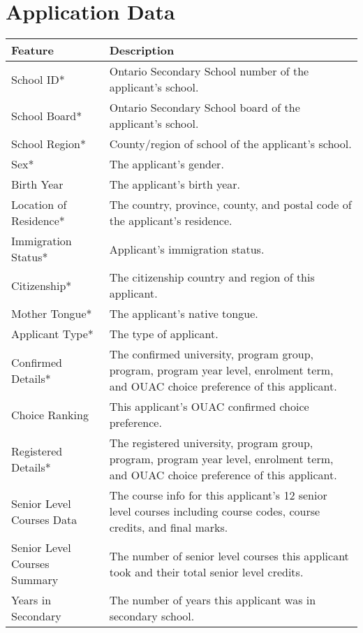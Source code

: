 \documentclass[titlepage]{article}
\begin{document}
\section{Application Data}
\label{app:applicationData}
\vspace*{\fill}
\begin{table}[!hb]
\begin{center}
\begin{tabular}{| C{4cm} | C{10cm} |}\hline
	\textbf{Feature}				&\textbf{Description}\\\hline
	School ID*						&Ontario Secondary School number of the applicant's school.\\\hline
	School Board*					&Ontario Secondary School board of the applicant's school.\\\hline
	School Region*					&County/region of school of the applicant's school.\\\hline
	Sex*							&The applicant's gender.\\\hline
	Birth Year						&The applicant's birth year.\\\hline
	Location of Residence*			&The country, province, county, and postal code of the applicant's residence.\\\hline
	Immigration Status*				&Applicant's immigration status.\\\hline
	Citizenship*					&The citizenship country and region of this applicant.\\\hline
	Mother Tongue*					&The applicant's native tongue.\\\hline
	Applicant Type*					&The type of applicant.\\\hline
	Confirmed Details*				&The confirmed university, program group, program, program year level, enrolment term, and OUAC choice preference of this applicant.\\\hline
	Choice Ranking					&This applicant's OUAC confirmed choice preference.\\\hline
	Registered Details*				&The registered university, program group, program, program year level, enrolment term, and OUAC choice preference of this applicant.\\\hline
	Senior Level Courses Data		&The course info for this applicant's 12 senior level courses including course codes, course credits, and final marks.\\\hline
	Senior Level Courses Summary	&The number of senior level courses this applicant took and their total senior level credits.\\\hline
	Years in Secondary				&The number of years this applicant was in secondary school.\\\hline

\end{tabular}
\end{center}
\end{table}
\end{document}
